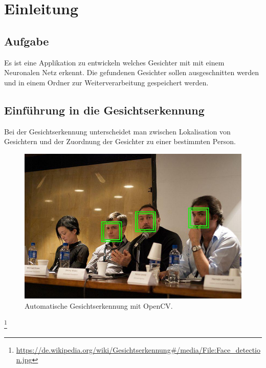 \chapter{Einleitung}

\section{Aufgabe}
Es ist eine Applikation zu entwickeln welches Gesichter mit mit einem Neuronalen  Netz erkennt. Die gefundenen Gesichter sollen ausgeschnitten werden und in einem Ordner zur Weiterverarbeitung gespeichert werden.

\section{Einführung in die Gesichtserkennung}
Bei der Gesichtserkennung unterscheidet man zwischen Lokalisation von Gesichtern  und der Zuordnung der Gesichter zu einer bestimmten Person.\\%
\begin{figure}
	\includegraphics[width=1.0\textwidth]{bilder/face-detection.jpg}	
	\caption{Automatische Gesichtserkennung mit OpenCV.}
\end{figure}
\footnote{\url{https://de.wikipedia.org/wiki/Gesichtserkennung\#/media/File:Face\_detection.jpg}}